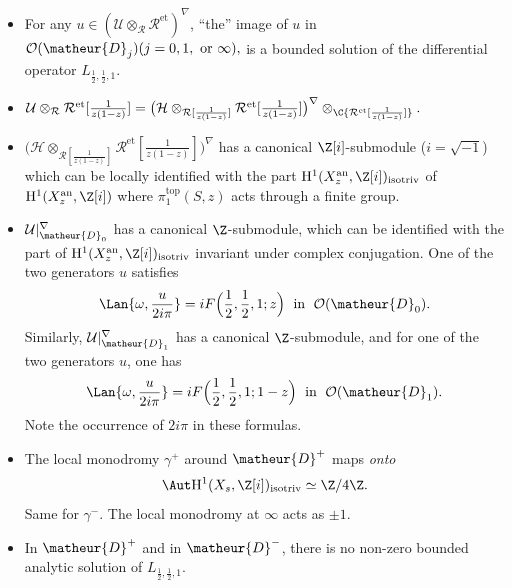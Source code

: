 \begin{itemize}
 \item For any $u \in (\mathcal{U}\otimes_\mathcal{R}
       {\mathcal{R}^{\mathrm{et}}})^{\nabla}$, ``the'' image of $u$ in
       $\mathcal{O}(\matheur{D}_j) (j=0,1, \text{ or } \infty),$ is a
       bounded solution of the differential operator $L_{\frac{1}{2},\frac{1}{2},1}$.
 \item $\mathcal{U}\otimes_\mathcal{R}
       {\mathcal{R}^{\mathrm{et}}[\frac{1}{z(1-z)}]} =
       \bigl(\mathcal{H}\otimes_{\mathcal{R}[\frac{1}{z(1-z)}]}
       {\mathcal{R}^{\mathrm{et}}[\frac{1}{z(1-z)}]}\bigr)^{\nabla}\otimes_\C
       {\mathcal{R}^{\mathrm{et}}[\frac{1}{z(1-z)}]}.$
 \item $\bigl(\mathcal{H}\otimes_{\mathcal{R}[\frac{1}{z(1-z)}]}
       {\mathcal{R}^{\mathrm{et}}[\frac{1}{z(1-z)}]}\bigr)^{\nabla}$ has a
       canonical ${\Z}[i]$-submodule ($i=\sqrt{-1}$) which can be
       locally identified with the part
       $\mathrm{H}^1(X_z^{\mathrm{an}},{\Z}[i])_{\mathrm{isotriv}}$ of
       $\mathrm{H}^1(X_z^{\mathrm{an}},{\Z}[i])$ where
       $\pi_1^{\mathrm{top}}(S,z)$ acts through a finite group.
 \item $\mathcal{U}|_{\matheur{D}_0}^{\nabla}$ has a
       canonical $\Z$-submodule, which can be identified with the part
       of $\mathrm{H}^1(X_z^{\mathrm{an}},{\Z}[i])_{\mathrm{isotriv}}$ invariant
       under complex conjugation. One of the two generators $u$ satisfies
       \begin{equation*}
	\Lan{\omega,\frac{u}{2i\pi}}=
	 i F\Bigl(\frac{1}{2},\frac{1}{2},1;z\Bigr)
	 \;\text{ in }\; \mathcal{O}(\matheur{D}_0).
       \end{equation*}
       Similarly, $\mathcal{U}|_{\matheur{D}_1}^{\nabla}$ has a canonical
       $\Z$-submodule, and for one of the two generators $u$, one has
       \begin{equation*}
	\Lan{\omega,\frac{u}{2i\pi}} =
	 i F\Bigl(\frac{1}{2},\frac{1}{2},1;1-z\Bigr)\;\text{ in }\;
	 \mathcal{O}(\matheur{D}_1).
       \end{equation*}
       Note the occurrence of $2i\pi$ in these formulas. 
 \item The local monodromy $\gamma^+$ around $\matheur{D}^+$
       maps \emph{onto}
       \[\Aut \mathrm{H}^1(X_{s},{\Z}[i])_{\mathrm{isotriv}}\simeq
       {\Z}/4{\Z}.\]
       Same for $\gamma^-$.
       The local monodromy at $\infty$ acts as $\pm1$.
 \item In $\matheur{D}^+$ and in $\matheur{D}^-$, there is no non-zero
       bounded analytic solution
       of $L_{\frac{1}{2},\frac{1}{2},1}$.
\end{itemize}


